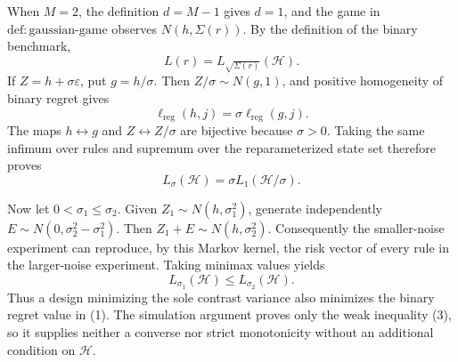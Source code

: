 When \(M=2\), the definition \(d=M-1\) gives \(d=1\), and the game in \(\mathrm{def:gaussian\text{-}game}\) observes \(N(h,\Sigma(r))\).  By the definition of the binary benchmark,
\[
 L(r)=L_{\sqrt{\Sigma(r)}}(\mathcal H).                              \tag{1}
\]
If \(Z=h+\sigma\varepsilon\), put \(g=h/\sigma\).  Then \(Z/\sigma\sim N(g,1)\), and positive homogeneity of binary regret gives
\[
 \ell_{\mathrm{reg}}(h,j)=\sigma\ell_{\mathrm{reg}}(g,j).
\]
The maps \(h\leftrightarrow g\) and \(Z\leftrightarrow Z/\sigma\) are bijective because \(\sigma>0\).  Taking the same infimum over rules and supremum over the reparameterized state set therefore proves
\[
 L_\sigma(\mathcal H)=\sigma L_1(\mathcal H/\sigma).                \tag{2}
\]

Now let \(0<\sigma_1\leq\sigma_2\).  Given \(Z_1\sim N(h,\sigma_1^2)\), generate independently \(E\sim N(0,\sigma_2^2-\sigma_1^2)\).  Then \(Z_1+E\sim N(h,\sigma_2^2)\).  Consequently the smaller-noise experiment can reproduce, by this Markov kernel, the risk vector of every rule in the larger-noise experiment.  Taking minimax values yields
\[
 L_{\sigma_1}(\mathcal H)\leq L_{\sigma_2}(\mathcal H).            \tag{3}
\]
Thus a design minimizing the sole contrast variance also minimizes the binary regret value in (1).  The simulation argument proves only the weak inequality (3), so it supplies neither a converse nor strict monotonicity without an additional condition on \(\mathcal H\).
